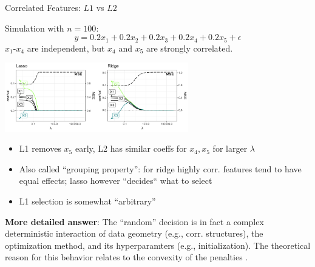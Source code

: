 \documentclass[11pt,compress,t,notes=noshow, xcolor=table]{beamer}
\begin{document}
\begin{vbframe}{Correlated Features: $L1$ vs $L2$}


Simulation with $n=100$: 
$$y = 0.2x_1 + 0.2x_2 + 0.2x_3 + 0.2x_4 + 0.2x_5 + \epsilon$$
$x_1$-$x_4$ are independent, but $x_4$ and $x_5$ are strongly correlated.

\begin{center}
\includegraphics[width=0.6\textwidth]{figure/multicollinearity_example.png}
\end{center}


\begin{itemize}
\item L1 removes $x_5$ early, L2 has similar coeffs for $x_4, x_5$ for larger $\lambda$
\item Also called ``grouping property'': for ridge highly corr. features tend to have equal effects; lasso however ``decides`` what to select
\item L1 selection is somewhat ``arbitrary''
\end{itemize}

\framebreak

\textbf{More detailed answer}: The ``random'' decision is in fact a complex deterministic interaction of data geometry (e.g., corr. structures), the optimization method, and its hyperparamters (e.g., initialization). The theoretical reason for this behavior relates to the convexity of the penalties .

\vspace{0.1cm}


\end{vbframe}
\end{document}
